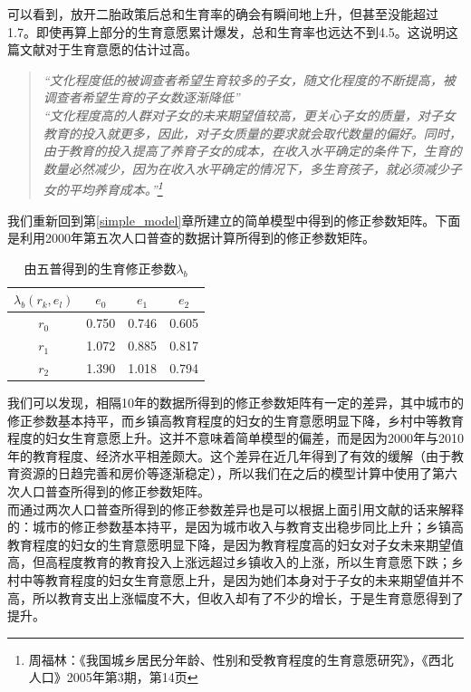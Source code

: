 \documentclass[a4paper]{article}
\begin{document}
\indent
可以看到，放开二胎政策后总和生育率的确会有瞬间地上升，但甚至没能超过1.7。即使再算上部分的生育意愿累计爆发，总和生育率也远达不到4.5。这说明这篇文献对于生育意愿的估计过高。\\
\indent
\begin{quote}
\textit{“文化程度低的被调查者希望生育较多的子女，随文化程度的不断提高，被调查者希望生育的子女数逐渐降低”\\
“文化程度高的人群对子女的未来期望值较高，更关心子女的质量，对子女教育的投入就更多，因此，对子女质量的要求就会取代数量的偏好。同时，由于教育的投入提高了养育子女的成本，在收入水平确定的条件下，生育的数量必然减少，因为在收入水平确定的情况下，多生育孩子，就必须减少子女的平均养育成本。”\footnote{周福林：《我国城乡居民分年龄、性别和受教育程度的生育意愿研究》，《西北人口》2005年第3期，第14页}}
\end{quote}
\indent
我们重新回到第\ref{simple_model}章所建立的简单模型中得到的修正参数矩阵。下面是利用2000年第五次人口普查的数据计算所得到的修正参数矩阵。
	\begin{table}[H]
		\centering
		\caption{由五普得到的生育修正参数$\lambda_b$}
		\label{simple_lambda_b_value_2000}
		\begin{tabular}{c|ccc}
			$\lambda_b(r_k,e_l)$	&	$e_0$	&	$e_1$	&	$e_2$	\\
			\hline
			$r_0$								&	0.750	&	0.746	&	0.605	\\
			$r_1$								&	1.072	&	0.885	&	0.817	\\
			$r_2$								&	1.390	&	1.018	&	0.794	\\
		\end{tabular}
	\end{table}
\indent
我们可以发现，相隔10年的数据所得到的修正参数矩阵有一定的差异，其中城市的修正参数基本持平，而乡镇高教育程度的妇女的生育意愿明显下降，乡村中等教育程度的妇女生育意愿上升。这并不意味着简单模型的偏差，而是因为2000年与2010年的教育程度、经济水平相差颇大。这个差异在近几年得到了有效的缓解（由于教育资源的日趋完善和房价等逐渐稳定），所以我们在之后的模型计算中使用了第六次人口普查所得到的修正参数矩阵。\\
\indent
而通过两次人口普查所得到的修正参数差异也是可以根据上面引用文献的话来解释的：城市的修正参数基本持平，是因为城市收入与教育支出稳步同比上升；乡镇高教育程度的妇女的生育意愿明显下降，是因为教育程度高的妇女对子女未来期望值高，但高程度教育的教育投入上涨远超过乡镇收入的上涨，所以生育意愿下跌；乡村中等教育程度的妇女生育意愿上升，是因为她们本身对于子女的未来期望值并不高，所以教育支出上涨幅度不大，但收入却有了不少的增长，于是生育意愿得到了提升。
	
\end{document}
